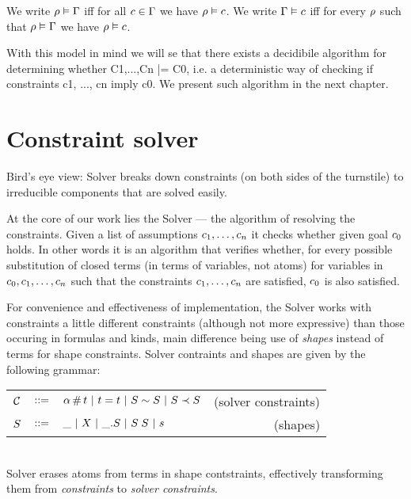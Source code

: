 \documentclass[english, mgr]{iithesis}
\begin{document}
We write $\rho \vDash \Gamma$ iff for all $c \in \Gamma$
we have $\rho \vDash c$.
We write $\Gamma \vDash c$ iff
for every $\rho$ such that $\rho \vDash \Gamma$
we have $\rho \vDash c$.


With this model in mind we will se that there exists a decidibile algorithm
for determining whether C1,...,Cn |= C0,
i.e. a deterministic way of checking if constraints c1, ..., cn imply c0.
We present such algorithm in the next chapter.


\chapter{Constraint solver}
Bird's eye view: Solver breaks down constraints (on both sides of the turnstile)
to irreducible components that are solved easily.


At the core of our work lies the Solver
--- the algorithm of resolving the constraints.
Given a list of assumptions $c_1, \dots, c_n$ it checks whether
given goal $c_0$ holds.
In other words it is an algorithm that verifies whether,
for every possible substitution of closed terms (in terms of variables, not atoms)
for variables in $c_0, c_1, \dots, c_n$ such that the constraints
$c_1, \dots, c_n$ are satisfied, $c_0$ is also satisfied.

For convenience and effectiveness of implementation, the Solver works with
constraints a little different constraints (although not more expressive)
than those occuring in formulas and kinds,
main difference being use of \textit{shapes} instead of terms for shape constraints.
Solver contraints and shapes are given by the following grammar: \\
\begin{tabular}{rclr}
  $\mathcal{C}$ & $::=$ & $\alpha \,\#\, t
  \ |\  t = t
  \ |\  S \sim S
  \ |\  S \prec S$
      & (solver constraints) \\
  $S$      & $::=$ & $\_
                 \ |\   X
                 \ |\  \_. S
                 \ |\  S \; S
                 \ |\  s$
      & (shapes)
\end{tabular}\\
Solver erases atoms from terms in shape contstraints, effectively transforming
them from \textit{constraints} to \textit{solver constraints}.
\end{document}
